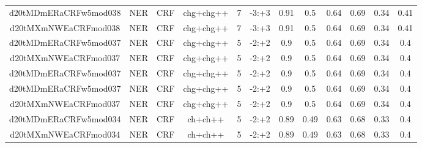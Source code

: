\documentclass[a4paper]{article}
\begin{document}
\begin{landscape}
\begin{center}
\begin{tabular}{ |c|c|c|c|c|c|c|c|c|c|c|c|}
 	

 
 	
 	\small{ d20tMDmERaCRFw5mod038 } & \small{ NER} & \small{  CRF }  & chg+chg++  &  7 &  \small{  -3:+3 }  &  0.91 & 0.5 & 0.64  &  0.69 & 0.34 & 0.41 \\
 	

 
 	
 	\small{ d20tMXmNWEaCRFmod038 } & \small{ NER} & \small{  CRF }  & chg+chg++  &  7 &  \small{  -3:+3 }  &  0.91 & 0.5 & 0.64  &  0.69 & 0.34 & 0.41 \\
 	

 
 	
 	\small{ d20tMDmERaCRFw5mod037 } & \small{ NER} & \small{  CRF }  & chg+chg++  &  5 &  \small{  -2:+2 }  &  0.9 & 0.5 & 0.64  &  0.69 & 0.34 & 0.4 \\
 	

 
 	
 	\small{ d20tMXmNWEaCRFmod037 } & \small{ NER} & \small{  CRF }  & chg+chg++  &  5 &  \small{  -2:+2 }  &  0.9 & 0.5 & 0.64  &  0.69 & 0.34 & 0.4 \\
 	

 
 	
 	\small{ d20tMDmERaCRFw5mod037 } & \small{ NER} & \small{  CRF }  & chg+chg++  &  5 &  \small{  -2:+2 }  &  0.9 & 0.5 & 0.64  &  0.69 & 0.34 & 0.4 \\
 	

 
 	
 	\small{ d20tMDmERaCRFw5mod037 } & \small{ NER} & \small{  CRF }  & chg+chg++  &  5 &  \small{  -2:+2 }  &  0.9 & 0.5 & 0.64  &  0.69 & 0.34 & 0.4 \\
 	

 
 	
 	\small{ d20tMXmNWEaCRFmod037 } & \small{ NER} & \small{  CRF }  & chg+chg++  &  5 &  \small{  -2:+2 }  &  0.9 & 0.5 & 0.64  &  0.69 & 0.34 & 0.4 \\
 	

 
 	
 	\small{ d20tMDmERaCRFw5mod034 } & \small{ NER} & \small{  CRF }  & ch+ch++  &  5 &  \small{  -2:+2 }  &  0.89 & 0.49 & 0.63  &  0.68 & 0.33 & 0.4 \\
 	

 
 	
 	\small{ d20tMXmNWEaCRFmod034 } & \small{ NER} & \small{  CRF }  & ch+ch++  &  5 &  \small{  -2:+2 }  &  0.89 & 0.49 & 0.63  &  0.68 & 0.33 & 0.4 \\
 	


\end{tabular}
\end{center}
\end{landscape}
\end{document}
